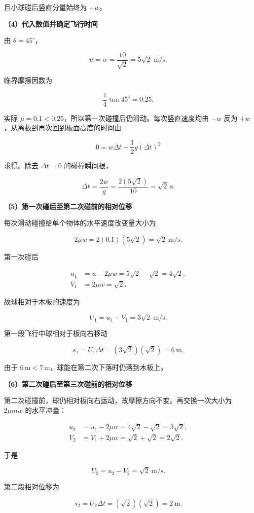 \documentclass[12pt,a4paper,UTF8]{ctexart}
\begin{document}
且小球碰后竖直分量始终为 \(+w\)。

\textbf{（4）代入数值并确定飞行时间}

由 \(\theta=45^\circ\)，

\[u=w=\frac{10}{\sqrt2}=5\sqrt2\ \mathrm{m/s}.\]

临界摩擦因数为

\[\frac14\tan45^\circ=0.25.\]

实际 \(\mu=0.1<0.25\)，所以第一次碰撞后仍滑动。每次竖直速度均由 \(-w\)
反为 \(+w\)，从离板到再次回到板面高度的时间由

\[0=w\Delta t-\frac12g(\Delta t)^2\]

求得。除去 \(\Delta t=0\) 的碰撞瞬间根，

\[\Delta t=\frac{2w}{g}=\frac{2(5\sqrt2)}{10}=\sqrt2\ \mathrm s.\]

\textbf{（5）第一次碰后至第二次碰前的相对位移}

每次滑动碰撞给单个物体的水平速度改变量大小为

\[2\mu w=2(0.1)(5\sqrt2)=\sqrt2\ \mathrm{m/s}.\]

第一次碰后

\[\begin{aligned}
u_1&=u-2\mu w=5\sqrt2-\sqrt2=4\sqrt2,\\
V_1&=2\mu w=\sqrt2.
\end{aligned}\]

故球相对于木板的速度为

\[U_1=u_1-V_1=3\sqrt2\ \mathrm{m/s}.\]

第一段飞行中球相对于板向右移动

\[s_1=U_1\Delta t=(3\sqrt2)(\sqrt2)=6\ \mathrm m.\]

由于 \(6\,\mathrm m<7\,\mathrm m\)，球能在第二次下落时仍落到木板上。

\textbf{（6）第二次碰后至第三次碰前的相对位移}

第二次碰撞前，球仍相对板向右运动，故摩擦方向不变。再交换一次大小为
\(2\mu mw\) 的水平冲量：

\[\begin{aligned}
u_2&=u_1-2\mu w=4\sqrt2-\sqrt2=3\sqrt2,\\
V_2&=V_1+2\mu w=\sqrt2+\sqrt2=2\sqrt2.
\end{aligned}\]

于是

\[U_2=u_2-V_2=\sqrt2\ \mathrm{m/s}.\]

第二段相对位移为

\[s_2=U_2\Delta t=(\sqrt2)(\sqrt2)=2\ \mathrm m.\]
\end{document}
